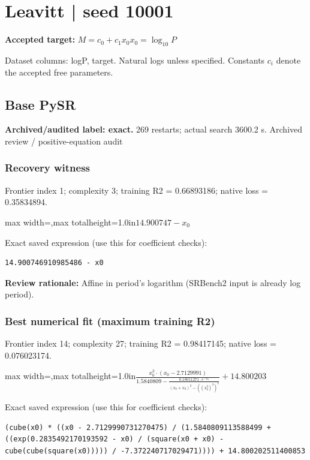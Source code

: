 \documentclass[10pt,letterpaper,landscape]{article}
\begin{document}
\section*{Leavitt | seed 10001}
\textbf{Accepted target:} $\displaystyle M=c_0+c_1x_0$\hfill $x_0=\log_{10}P$\par
{\small Dataset columns: logP, target. Natural logs unless specified. Constants $c_i$ denote the accepted free parameters.}\par\medskip
\begin{minipage}[t]{0.485\textwidth}
\subsection*{Base PySR}
\textbf{Archived/audited label: exact.} 269 restarts; actual search 3600.2 s.
{\small Archived review / positive-equation audit}
\subsubsection*{Recovery witness}
Frontier index 1; complexity 3; training R2 = 0.66893186; native loss = 0.35834894.
\begin{center}\begin{adjustbox}{max width=\linewidth,max totalheight=1.0in}$\displaystyle 14.900747 - x_{0}$\end{adjustbox}\end{center}
{\scriptsize Exact saved expression (use this for coefficient checks):}
\begin{lstlisting}
14.900746910985486 - x0
\end{lstlisting}
{\small\textbf{Review rationale:} Affine in period's logarithm (SRBench2 input is already log period).}
\subsubsection*{Best numerical fit (maximum training R2)}
Frontier index 14; complexity 27; training R2 = 0.98417145; native loss = 0.076023174.
\begin{center}\begin{adjustbox}{max width=\linewidth,max totalheight=1.0in}$\displaystyle \frac{x_{0}^{3} \cdot \left(x_{0} - 2.7129991\right)}{1.5840809 - \frac{0.18011271 \cdot e^{- x_{0}}}{\left(x_{0} + x_{0}\right)^{2} - \left(\left(x_{0}^{2}\right)^{3}\right)^{3}}} + 14.800203$\end{adjustbox}\end{center}
{\scriptsize Exact saved expression (use this for coefficient checks):}
\begin{lstlisting}
(cube(x0) * ((x0 - 2.7129990731270475) / (1.5840809113588499 + ((exp(0.2835492170193592 - x0) / (square(x0 + x0) - cube(cube(square(x0))))) / -7.372240717029471)))) + 14.800202511400853
\end{lstlisting}
\end{minipage}\hfill
\end{document}
